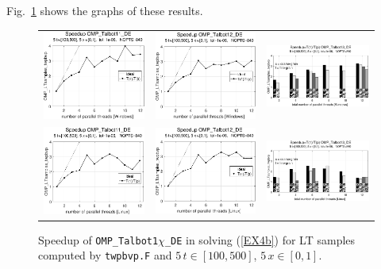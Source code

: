 \documentclass[a4paper,10pt]{report}%
\begin{document}
Fig.~\ref{PAR_EX4b_speedup_twpbvp} shows the graphs of these results.
\begin{figure}[htb]
\centering
\begin{tabular}{ccc} %
\includegraphics[height=0.2\textwidth]{./FIGS/EX4b/EX4b_twpbvp_speedup_11_5t_100_Windows.eps} &
\includegraphics[height=0.2\textwidth]{./FIGS/EX4b/EX4b_twpbvp_speedup_12_5t_100_Windows.eps} &
\includegraphics[height=0.2\textwidth,keepaspectratio=true]{./FIGS/EX4b/EX4b_twpbvp_speedup_13_5t_100_Windows.eps} \\
\includegraphics[height=0.2\textwidth]{./FIGS/EX4b/EX4b_twpbvp_speedup_11_5t_100_Linux.eps} &
\includegraphics[height=0.2\textwidth]{./FIGS/EX4b/EX4b_twpbvp_speedup_12_5t_100_Linux.eps} &
\includegraphics[height=0.2\textwidth,keepaspectratio=true]{./FIGS/EX4b/EX4b_twpbvp_speedup_13_5t_100_Linux.eps}
\end{tabular}
\caption{\small Speedup of {\tt OMP\_Talbot1$\chi$\_DE} in solving (\ref{EX4b}) for LT samples computed
by {\tt twpbvp.F} and $5\,t\in[100,500]$, $5\,x\in[0,1]$.}
\label{PAR_EX4b_speedup_twpbvp}
\end{figure}
\end{document}
